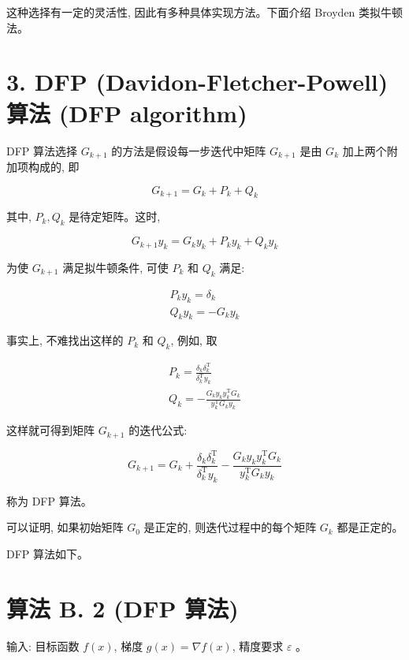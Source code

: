 \documentclass[10pt]{article}
\begin{document}
这种选择有一定的灵活性, 因此有多种具体实现方法。下面介绍 Broyden 类拟牛顿法。

\section*{3. DFP (Davidon-Fletcher-Powell) 算法 (DFP algorithm)}
DFP 算法选择 $G_{k+1}$ 的方法是假设每一步迭代中矩阵 $G_{k+1}$ 是由 $G_{k}$ 加上两个附加项构成的, 即


\begin{equation*}
G_{k+1}=G_{k}+P_{k}+Q_{k} \tag{B.18}
\end{equation*}


其中, $P_{k}, Q_{k}$ 是待定矩阵。这时,


\begin{equation*}
G_{k+1} y_{k}=G_{k} y_{k}+P_{k} y_{k}+Q_{k} y_{k} \tag{B.19}
\end{equation*}


为使 $G_{k+1}$ 满足拟牛顿条件, 可使 $P_{k}$ 和 $Q_{k}$ 满足:


\begin{gather*}
P_{k} y_{k}=\delta_{k}  \tag{B.20}\\
Q_{k} y_{k}=-G_{k} y_{k} \tag{B.21}
\end{gather*}


事实上, 不难找出这样的 $P_{k}$ 和 $Q_{k}$, 例如, 取


\begin{gather*}
P_{k}=\frac{\delta_{k} \delta_{k}^{\mathrm{T}}}{\delta_{k}^{\mathrm{T}} y_{k}}  \tag{B.22}\\
Q_{k}=-\frac{G_{k} y_{k} y_{k}^{\mathrm{T}} G_{k}}{y_{k}^{\mathrm{T}} G_{k} y_{k}} \tag{B.23}
\end{gather*}


这样就可得到矩阵 $G_{k+1}$ 的迭代公式:


\begin{equation*}
G_{k+1}=G_{k}+\frac{\delta_{k} \delta_{k}^{\mathrm{T}}}{\delta_{k}^{\mathrm{T}} y_{k}}-\frac{G_{k} y_{k} y_{k}^{\mathrm{T}} G_{k}}{y_{k}^{\mathrm{T}} G_{k} y_{k}} \tag{B.24}
\end{equation*}


称为 DFP 算法。

可以证明, 如果初始矩阵 $G_{0}$ 是正定的, 则迭代过程中的每个矩阵 $G_{k}$ 都是正定的。

DFP 算法如下。

\section*{算法 B. 2 (DFP 算法)}
输入: 目标函数 $f(x)$, 梯度 $g(x)=\nabla f(x)$, 精度要求 $\varepsilon$ 。
\end{document}
